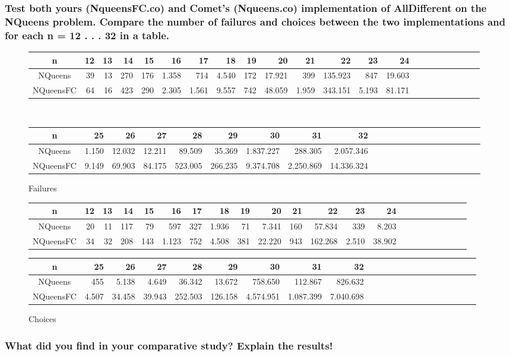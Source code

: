 \documentclass[a4paper ,12pt,french]{article}
\begin{document}
\subsubsection{Test both yours (NqueensFC.co) and Comet’s (Nqueens.co) implementation of AllDifferent on the NQueens problem. Compare the number of failures and choices between the two implementations and for each n = 12 . . . 32 in a table.}


\begin{figure}[!h]\hspace{-1.2cm}
\begin{tabular}{|c||r|r|r|r|r|r|r|r|r|r|r|r|r|r|r|r|r|r|r|r|r|}
\hline
n&12&13&14&15&16&17&18&19&20&21&22 &23&24  \\
\hline\hline
NQueens &39&13&270&176&1.358&714&4.540&172&17.921&399&135.923&847&19.603    \\
\hline
NQueensFC &64&16&423&290&2.305&1.561&9.557&742&48.059&1.959&343.151& 5.193 &81.171    \\
\hline
\end{tabular}
\\
\begin{tabular}{|c||r|r|r|r|r|r|r|r|r|r|r|r|r|r|r|r|r|r|r|r|r|}
\hline
n&25&26&27&28&29&30&31&32   \\
\hline\hline
NQueens &1.150&12.032&12.211&89.509&35.369&1.837.227&288.305&2.057.346    \\
\hline
NQueensFC &9.149&69.903& 84.175&523.005&266.235& 9.374.708&2.250.869&14.336.324 \\
\hline
\end{tabular}
\caption{Failures}
\end{figure}
\begin{figure}[!h]\hspace{-1cm}
\begin{tabular}{|c||r|r|r|r|r|r|r|r|r|r|r|r|r|r|r|r|r|r|r|r|r|}
\hline
n&12&13&14&15&16&17&18&19&20&21&22 &23&24  \\
\hline\hline
NQueens &20&11&117&79&597&327&1.936&71&7.341&160&57.834 &339 &8.203   \\
\hline
NQueensFC &34&32&208&143&1.123&752&4.508&381&22.220&943& 162.268 &2.510 &38.902\\
\hline
\end{tabular}
\begin{tabular}{|c||r|r|r|r|r|r|r|r|r|r|r|r|r|r|r|r|r|r|r|r|r|}
\hline
n&25&26&27&28&29&30&31&32   \\
\hline\hline
NQueens &455&5.138&4.649&36.342&13.672&758.650&112.867&826.632     \\
\hline
NQueensFC &4.507&34.458&39.943&252.503&126.158&4.574.951&1.087.399&7.040.698  \\
\hline
\end{tabular}
\caption{Choices}
\end{figure}



\subsubsection{What did you find in your comparative study? Explain the results!}
\end{document}
